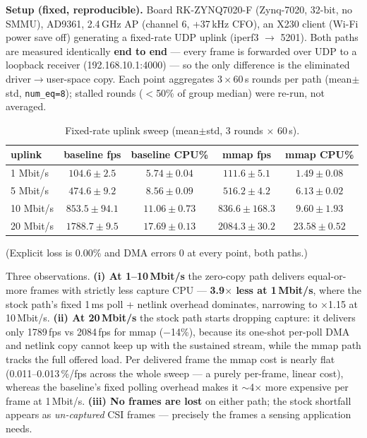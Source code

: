 \documentclass[10pt,a4paper]{article}
\begin{document}
\textbf{Setup (fixed, reproducible).} Board RK-ZYNQ7020-F (Zynq-7020, 32-bit,
no SMMU), AD9361, 2.4\,GHz AP (channel 6, +37\,kHz CFO), an X230 client
(Wi-Fi power save off) generating a fixed-rate UDP uplink (iperf3
$\rightarrow$ 5201). Both paths are measured identically \textbf{end to end}
--- every frame is forwarded over UDP to a loopback receiver
(192.168.10.1:4000) --- so the only difference is the eliminated
driver$\rightarrow$user-space copy. Each point aggregates $3\times60$\,s
rounds per path (mean$\pm$std, \texttt{num\_eq=8}); stalled rounds
($<$50\% of group median) were re-run, not averaged.

\begin{table}[t]
  \centering
  \caption{Fixed-rate uplink sweep (mean$\pm$std, 3 rounds $\times$ 60\,s).}
  \label{tab:sweep}
  \begin{tabular}{lcccc}
    \toprule
    uplink & baseline fps & baseline CPU\% & mmap fps & mmap CPU\% \\
    \midrule
    1 Mbit/s  & $104.6\pm2.5$   & $5.74\pm0.04$ & $111.6\pm5.1$    & $1.49\pm0.08$ \\
    5 Mbit/s  & $474.6\pm9.2$   & $8.56\pm0.09$ & $516.2\pm4.2$    & $6.13\pm0.02$ \\
    10 Mbit/s & $853.5\pm94.1$  & $11.06\pm0.73$ & $836.6\pm168.3$ & $9.60\pm1.93$ \\
    20 Mbit/s & $1788.7\pm9.5$  & $17.69\pm0.13$ & $2084.3\pm30.2$ & $23.58\pm0.52$ \\
    \bottomrule
  \end{tabular}
\end{table}
(Explicit loss is 0.00\% and DMA errors 0 at every point, both paths.)

Three observations. \textbf{(i) At 1--10\,Mbit/s} the zero-copy path delivers
equal-or-more frames with strictly less capture CPU --- \textbf{3.9$\times$
less at 1\,Mbit/s}, where the stock path's fixed 1\,ms poll + netlink
overhead dominates, narrowing to $\times$1.15 at 10\,Mbit/s. \textbf{(ii) At
20\,Mbit/s} the stock path starts dropping capture: it delivers only
1789\,fps vs 2084\,fps for mmap ($-$14\%), because its one-shot per-poll DMA
and netlink copy cannot keep up with the sustained stream, while the mmap
path tracks the full offered load. Per delivered frame the mmap cost is
nearly flat (0.011--0.013\,\%/fps across the whole sweep --- a purely
per-frame, linear cost), whereas the baseline's fixed polling overhead makes
it $\sim$4$\times$ more expensive per frame at 1\,Mbit/s. \textbf{(iii) No
frames are lost} on either path; the stock shortfall appears as
\emph{un-captured} CSI frames --- precisely the frames a sensing application
needs.
\end{document}
